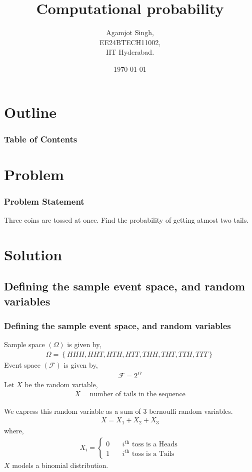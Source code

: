 \documentclass{beamer}
\title{Computational probability \brak{\text{11.16.3.8.9}}}
\author{Agamjot Singh,\\EE24BTECH11002,\\IIT Hyderabad.}
\date{\today}
\providecommand{\brak}[1]{\ensuremath{\left(#1\right)}}
\providecommand{\cbrak}[1]{\ensuremath{\left\{#1\right\}}}
\theoremstyle{remark}
\numberwithin{equation}{section}
\begin{document}
\begin{frame}
\titlepage
\end{frame}

\section*{Outline}
\begin{frame}
\frametitle{Table of Contents}
\tableofcontents
\end{frame}

\section{Problem}

\begin{frame}
\frametitle{Problem Statement}
Three coins are tossed at once. Find the probability of getting atmost two tails.
\end{frame}

\section{Solution}

\subsection{Defining the sample event space, and random variables}
\begin{frame}
\frametitle{Defining the sample event space, and random variables}
Sample space $\brak{\Omega}$ is given by,
\begin{align}
    \Omega = \cbrak{HHH, HHT, HTH, HTT, THH, THT, TTH, TTT}
\end{align}
Event space $\brak{\mathcal{F}}$ is given by,
\begin{align}
    \mathcal{F} = 2^{\Omega}
\end{align}
Let $X$ be the random variable,
\begin{align}
    X = \text{number of tails in the sequence}
\end{align}
\end{frame}

\begin{frame}
We express this random variable as a sum of $3$ bernoulli random variables.
\begin{align}
    X = X_1 + X_2 + X_3
\end{align}
where,
\begin{align}
    X_{i} = \begin{cases}
        0 & \quad i^{\text{th}} \text{ toss is a Heads}\\
        1 & \quad i^{\text{th}} \text{ toss is a Tails}
    \end{cases}
\end{align}
$X$ models a binomial distribution.
\end{frame}
\end{document}
